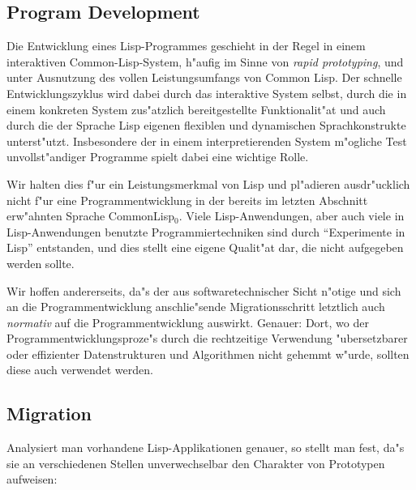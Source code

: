 \subsection{Program Development}

Die Entwicklung eines Lisp-Programmes geschieht in der Regel in einem
interaktiven Common-Lisp-System, h"aufig im Sinne von {\em rapid
prototyping}, und unter Ausnutzung des vollen Leistungsumfangs von
Common Lisp. Der schnelle Entwicklungszyklus wird dabei durch das
interaktive System selbst, durch die in einem konkreten System
zus"atzlich bereitgestellte Funktionalit"at und auch durch die der
Sprache Lisp eigenen flexiblen und dynamischen Sprachkonstrukte
unterst"utzt. Insbesondere der in einem interpretierenden System
m"ogliche Test unvollst"andiger Programme spielt dabei eine wichtige
Rolle. 

Wir halten dies f"ur ein Leistungsmerkmal von Lisp und pl"adieren
ausdr"ucklich nicht f"ur eine Programmentwicklung in der bereits im
letzten Abschnitt erw"ahnten Sprache CommonLisp$_0$. Viele
Lisp-Anwendungen, aber auch viele in Lisp-Anwendungen benutzte
Programmiertechniken sind durch "`Experimente in Lisp"' entstanden,
und dies stellt eine eigene Qualit"at dar, die nicht aufgegeben werden
sollte. 

Wir hoffen andererseits, da"s der aus softwaretechnischer Sicht
n"otige und sich an die Programmentwicklung anschlie"sende
Migrationsschritt letztlich auch {\em normativ} auf die
Programmentwicklung auswirkt. Genauer: Dort, wo der
Programmentwicklungsproze"s durch die rechtzeitige Verwendung
"ubersetzbarer oder effizienter Datenstrukturen und Algorithmen
nicht gehemmt w"urde, sollten diese auch verwendet werden.

\subsection{Migration}

Analysiert man vorhandene Lisp-Applikationen genauer, so stellt man
fest, da"s sie an verschiedenen Stellen unverwechselbar den Charakter
von Prototypen aufweisen:

